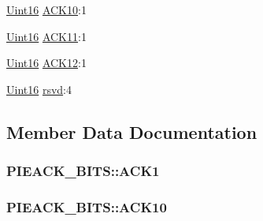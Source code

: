 \begin{DoxyCompactItemize}
\item 
\hyperlink{_d_s_p2833x___device_8h_a59a9f6be4562c327cbfb4f7e8e18f08b}{Uint16} \hyperlink{struct_p_i_e_a_c_k___b_i_t_s_ab8dcdd14f1feeb2ce3defc7ba08c3205}{A\+C\+K10}\+:1
\item 
\hyperlink{_d_s_p2833x___device_8h_a59a9f6be4562c327cbfb4f7e8e18f08b}{Uint16} \hyperlink{struct_p_i_e_a_c_k___b_i_t_s_a296dd018f9399bb368ad838598bd2ed5}{A\+C\+K11}\+:1
\item 
\hyperlink{_d_s_p2833x___device_8h_a59a9f6be4562c327cbfb4f7e8e18f08b}{Uint16} \hyperlink{struct_p_i_e_a_c_k___b_i_t_s_a1b053a4f7a76b25d4f397a875fbb024b}{A\+C\+K12}\+:1
\item 
\hyperlink{_d_s_p2833x___device_8h_a59a9f6be4562c327cbfb4f7e8e18f08b}{Uint16} \hyperlink{struct_p_i_e_a_c_k___b_i_t_s_a496cb17a2112ffcf4a6c2d03c57e4110}{rsvd}\+:4
\end{DoxyCompactItemize}


\subsection{Member Data Documentation}
\hypertarget{struct_p_i_e_a_c_k___b_i_t_s_acceae4974e02bdcf9df391313d4d5cb0}{}
\subsubsection[{A\+C\+K1}]{ P\+I\+E\+A\+C\+K\+\_\+\+B\+I\+T\+S\+::\+A\+C\+K1}\label{struct_p_i_e_a_c_k___b_i_t_s_acceae4974e02bdcf9df391313d4d5cb0}
\hypertarget{struct_p_i_e_a_c_k___b_i_t_s_ab8dcdd14f1feeb2ce3defc7ba08c3205}{}
\subsubsection[{A\+C\+K10}]{ P\+I\+E\+A\+C\+K\+\_\+\+B\+I\+T\+S\+::\+A\+C\+K10}\label{struct_p_i_e_a_c_k___b_i_t_s_ab8dcdd14f1feeb2ce3defc7ba08c3205}
\hypertarget{struct_p_i_e_a_c_k___b_i_t_s_a296dd018f9399bb368ad838598bd2ed5}{}
